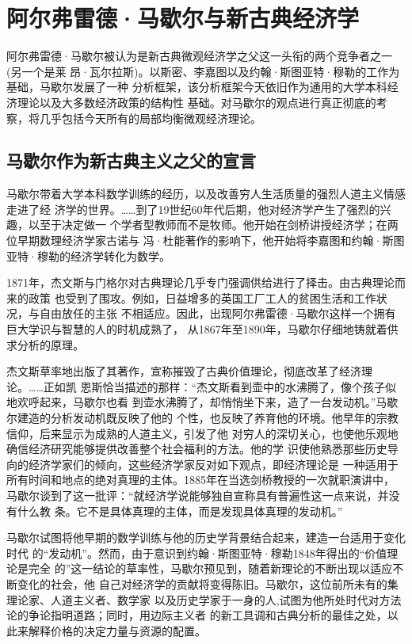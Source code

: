 \chapter{阿尔弗雷德·马歇尔与新古典经济学}

阿尔弗雷德·马歇尔被认为是新古典微观经济学之父这一头衔的两个竞争者之一(另一个是莱
昂·瓦尔拉斯)。以斯密、李嘉图以及约翰·斯图亚特·穆勒的工作为基础，马歇尔发展了一种
分析框架，该分析框架今天依旧作为通用的大学本科经济理论以及大多数经济政策的结构性
基础。对马歇尔的观点进行真正彻底的考察，将几乎包括今天所有的局部均衡微观经济理论。

\section{马歇尔作为新古典主义之父的宣言}

马歇尔带着大学本科数学训练的经历，以及改善穷人生活质量的强烈人道主义情感走进了经
济学的世界。……到了19世纪60年代后期，他对经济学产生了强烈的兴趣，以至于决定做一
个学者型教师而不是牧师。他开始在剑桥讲授经济学；在两位早期数理经济学家古诺与
冯·杜能著作的影响下，他开始将李嘉图和约翰·斯图亚特·穆勒的经济学转化为数学。

1871年，杰文斯与门格尔对古典理论几乎专门强调供给进行了择击。由古典理论而来的政策
也受到了围攻。例如，日益增多的英国工厂工人的贫困生活和工作状况，与自由放任的主张
不相适应。因此，出现阿尔弗雷德·马歇尔这样一个拥有巨大学识与智慧的人的时机成熟了，
从1867年至1890年，马歇尔仔细地铸就着供求分析的原理。

杰文斯草率地出版了其著作，宣称摧毁了古典价值理论，彻底改革了经济理论。……正如凯
恩斯恰当描述的那样：“杰文斯看到壶中的水沸腾了，像个孩子似地欢呼起来，马歇尔也看
到壶水沸腾了，却悄悄坐下来，造了一台发动机。”马歇尔建造的分析发动机既反映了他的
个性，也反映了养育他的环境。他早年的宗教信仰，后来显示为成熟的人道主义，引发了他
对穷人的深切关心，也使他乐观地确信经济研究能够提供改善整个社会福利的方法。他的学
识使他熟悉那些历史导向的经济学家们的倾向，这些经济学家反对如下观点，即经济理论是
一种适用于所有时间和地点的绝对真理的主体。1885年在当选剑桥教授的一次就职演讲中，
马歇尔谈到了这一批评：“就经济学说能够独自宣称具有普遍性这一点来说，并没有什么教
条。它不是具体真理的主体，而是发现具体真理的发动机。”

马歇尔试图将他早期的数学训练与他的历史学背景结合起来，建造一台适用于变化时代
的“发动机”。然而，由于意识到约翰·斯图亚特·穆勒1848年得出的“价值理论是完全
的”这一结论的草率性，马歇尔预见到，随着新理论的不断出现以适应不断变化的社会，他
自己对经济学的贡献将变得陈旧。马歇尔，这位前所未有的集理论家、人道主义者、数学家
以及历史学家于一身的人,试图为他所处时代对方法论的争论指明道路；同时，用边际主义者
的新工具调和古典分析的最佳之处，以此来解释价格的决定力量与资源的配置。

